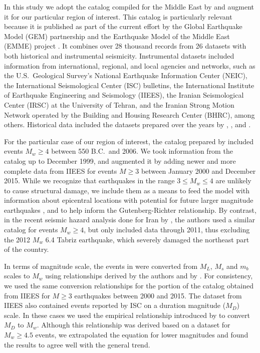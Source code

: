 In this study we adopt the catalog compiled for the Middle East by \citet{Zare2014} and augment it for our particular region of interest. This catalog is particularly relevant because it is published as part of the current effort by the Global Earthquake Model (GEM) partnership and the Earthquake Model of the Middle East (EMME) project \citep[as mentioned in][]{Zare2014}. It combines over 28 thousand records from 26 datasets with both historical and instrumental seismicity. Instrumental datasets included information from international, regional, and local agencies and networks, such as the U.S.~Geological Survey's National Earthquake Information Center (NEIC), the International Seismological Center (ISC) bulletins, the International Institute of Earthquake Engineering and Seismology (IIEES), the Iranian Seismological Center (IRSC) at the University of Tehran, and the Iranian Strong Motion Network operated by the Building and Housing Research Center (BHRC), among others. Historical data included the datasets prepared over the years by \citet{Ambraseys_1982_Book}, \citet{Ambraseys_2005_Book}, and \citet{Ambraseys_2009_Book}.

For the particular case of our region of interest, the catalog prepared by \citet{Zare2014} included events $M_w \geq 4$ between 550 B.C.~and 2006. We took information from the catalog up to December 1999, and augmented it by adding newer and more complete data from IIEES for events $M \geq 3$ between January 2000 and December 2015. While we recognize that earthquakes in the range $3 \leq M_w \leq 4$ are unlikely to cause structural damage, we include them as a means to feed the model with information about epicentral locations with potential for future larger magnitude earthquakes \citep{Kafka_2000_BSSA}, and to help inform the Guten\-berg-Richter relationship. By contrast, in the recent seismic hazard analysis done for Iran by \citet{Khodaverdian_2016_BSSA}, the authors used a similar catalog for events $M_w \geq 4$, but only included data through 2011, thus excluding the 2012 $M_w$ 6.4 Tabriz earthquake, which severely damaged the northeast part of the country.

In terms of magnitude scale, the events in \citet{Zare2014} were converted from $M_L$, $M_s$ and $m_b$ scales to $M_w$ using relationships derived by the authors and by \citet{Escordilis_2006_JS}. For consistency, we used the same conversion relationships for the portion of the catalog obtained from IIEES for $M \geq 3$ earthquakes between 2000 and 2015. The dataset from IIEES also contained events reported by ISC on a duration magnitude ($M_D$) scale. In these cases we used the empirical relationship introduced by \citet{Deniz2010} to convert $M_D$ to $M_w$. Although this relationship was derived based on a dataset for $M_w \geq 4.5$ events, we extrapolated the equation for lower magnitudes and found the results to agree well with the general trend.

